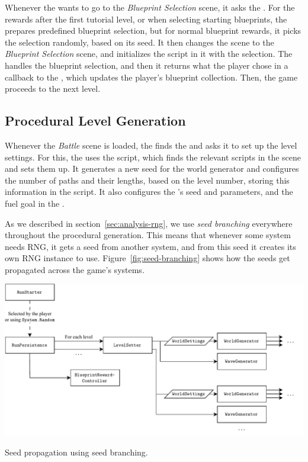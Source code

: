 Whenever the  wants to go to the \emph{Blueprint Selection} scene, it asks the .
For the rewards after the first tutorial level, or when selecting starting blueprints, the  prepares predefined blueprint selection, but for normal blueprint rewards, it picks the selection randomly, based on its seed.
It then changes the scene to the \emph{Blueprint Selection} scene, and initializes the  script in it with the selection.
The  handles the blueprint selection, and then it returns what the player chose in a callback to the , which updates the player's blueprint collection.
Then, the game proceeds to the next level.

\subsection{Procedural Level Generation}

Whenever the \emph{Battle} scene is loaded, the  finds the  and asks it to set up the level settings.
For this, the  uses the  script, which finds the relevant scripts in the scene and sets them up.
It generates a new seed for the world generator and configures the number of paths and their lengths, based on the level number, storing this information in the  script.
It also configures the 's seed and parameters, and the fuel goal in the .

As we described in section~\ref{sec:analysis-rng}, we use \emph{seed branching} everywhere throughout the procedural generation.
This means that whenever some system needs RNG, it gets a seed from another system, and from this seed it creates its own RNG instance to use.
Figure~\ref{fig:seed-branching} shows how the seeds get propagated across the game's systems.

\begin{center}
    \captionsetup{type=figure}
    \includegraphics[width=\textwidth]{img/seed splitting.pdf}
    \caption{Seed propagation using seed branching.}
    \label{fig:seed-branching}
\end{center}

